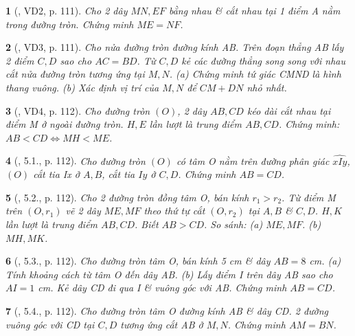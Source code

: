 \documentclass{article}
\newtheorem{baitoan}{}
\begin{document}
\begin{baitoan}[\cite{Binh_boi_duong_Toan_9_tap_1}, VD2, p. 111]
	Cho 2 dây $MN,EF$ bằng nhau \& cắt nhau tại 1 điểm A nằm trong đường tròn. Chứng minh $ME = NF$.
\end{baitoan}

\begin{baitoan}[\cite{Binh_boi_duong_Toan_9_tap_1}, VD3, p. 111]
	Cho nửa đường tròn đường kính AB. Trên đoạn thẳng AB lấy 2 điểm $C,D$ sao cho $AC = BD$. Từ $C,D$ kẻ các đường thẳng song song với nhau cắt nửa đường tròn tương ứng tại $M,N$. (a) Chứng minh tứ giác CMND là hình thang vuông. (b) Xác định vị trí của $M,N$ để $CM + DN$ nhỏ nhất.
\end{baitoan}

\begin{baitoan}[\cite{Binh_boi_duong_Toan_9_tap_1}, VD4, p. 112]
	Cho đường tròn $(O)$, 2 dây $AB,CD$ kéo dài cắt nhau tại điểm M ở ngoài đường tròn. $H,E$ lần lượt là trung điểm $AB,CD$. Chứng minh: $AB < CD\Leftrightarrow MH < ME$.
\end{baitoan}

\begin{baitoan}[\cite{Binh_boi_duong_Toan_9_tap_1}, 5.1., p. 112]
	Cho đường tròn $(O)$ có tâm O nằm trên đường phân giác $\widehat{xIy}$, $(O)$ cắt tia Ix ở $A,B$, cắt tia $Iy$ ở $C,D$. Chứng minh $AB = CD$.
\end{baitoan}

\begin{baitoan}[\cite{Binh_boi_duong_Toan_9_tap_1}, 5.2., p. 112]
	Cho 2 đường tròn đồng tâm O, bán kính $r_1 > r_2$. Từ điểm M trên $(O,r_1)$ vẽ 2 dây $ME,MF$ theo thứ tự cắt $(O,r_2)$ tại $A,B$ \& $C,D$. $H,K$ lần lượt là trung điểm $AB,CD$. Biết $AB > CD$. So sánh: (a) $ME,MF$. (b) $MH,MK$.
\end{baitoan}

\begin{baitoan}[\cite{Binh_boi_duong_Toan_9_tap_1}, 5.3., p. 112]
	Cho đường tròn tâm O, bán kính {\rm5 cm} \& dây $AB = 8$ {\rm cm}. (a) Tính khoảng cách từ tâm O đến dây AB. (b) Lấy điểm I trên dây AB sao cho $AI = 1$ {\rm cm}. Kẻ dây CD đi qua I \& vuông góc với AB. Chứng minh $AB = CD$.
\end{baitoan}

\begin{baitoan}[\cite{Binh_boi_duong_Toan_9_tap_1}, 5.4., p. 112]
	Cho đường tròn tâm O đường kính AB \& dây CD. 2 đường vuông góc với CD tại $C,D$ tương ứng cắt AB ở $M,N$. Chứng minh $AM = BN$.
\end{baitoan}
\end{document}
